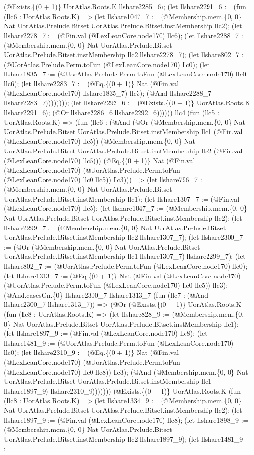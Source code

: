 \documentclass[11pt]{article}
\begin{document}
(@Exists.\{(0 + 1)\} UorAtlas.Roots.K llshare2285\_6); (let llshare2291\_6 := (fun (llc6 : UorAtlas.Roots.K) => (let llshare1047\_7 := (@Membership.mem.\{0, 0\} Nat UorAtlas.Prelude.Bitset UorAtlas.Prelude.Bitset.instMembership llc2); (let llshare2278\_7 := (@Fin.val (@LexLeanCore.node170) llc6); (let llshare2288\_7 := (@Membership.mem.\{0, 0\} Nat UorAtlas.Prelude.Bitset UorAtlas.Prelude.Bitset.instMembership llc2 llshare2278\_7); (let llshare802\_7 := (@UorAtlas.Prelude.Perm.toFun (@LexLeanCore.node170) llc0); (let llshare1835\_7 := (@UorAtlas.Prelude.Perm.toFun (@LexLeanCore.node170) llc0 llc6); (let llshare2283\_7 := (@Eq.\{(0 + 1)\} Nat (@Fin.val (@LexLeanCore.node170) llshare1835\_7) llc3); (@And llshare2288\_7 llshare2283\_7)))))))); (let llshare2292\_6 := (@Exists.\{(0 + 1)\} UorAtlas.Roots.K llshare2291\_6); (@Or llshare2286\_6 llshare2292\_6)))))) llc4 (fun (llc5 : UorAtlas.Roots.K) => (fun (llc6 : (@And (@Or (@Membership.mem.\{0, 0\} Nat UorAtlas.Prelude.Bitset UorAtlas.Prelude.Bitset.instMembership llc1 (@Fin.val (@LexLeanCore.node170) llc5)) (@Membership.mem.\{0, 0\} Nat UorAtlas.Prelude.Bitset UorAtlas.Prelude.Bitset.instMembership llc2 (@Fin.val (@LexLeanCore.node170) llc5))) (@Eq.\{(0 + 1)\} Nat (@Fin.val (@LexLeanCore.node170) (@UorAtlas.Prelude.Perm.toFun (@LexLeanCore.node170) llc0 llc5)) llc3))) => (let llshare796\_7 := (@Membership.mem.\{0, 0\} Nat UorAtlas.Prelude.Bitset UorAtlas.Prelude.Bitset.instMembership llc1); (let llshare1307\_7 := (@Fin.val (@LexLeanCore.node170) llc5); (let llshare1047\_7 := (@Membership.mem.\{0, 0\} Nat UorAtlas.Prelude.Bitset UorAtlas.Prelude.Bitset.instMembership llc2); (let llshare2299\_7 := (@Membership.mem.\{0, 0\} Nat UorAtlas.Prelude.Bitset UorAtlas.Prelude.Bitset.instMembership llc2 llshare1307\_7); (let llshare2300\_7 := (@Or (@Membership.mem.\{0, 0\} Nat UorAtlas.Prelude.Bitset UorAtlas.Prelude.Bitset.instMembership llc1 llshare1307\_7) llshare2299\_7); (let llshare802\_7 := (@UorAtlas.Prelude.Perm.toFun (@LexLeanCore.node170) llc0); (let llshare1313\_7 := (@Eq.\{(0 + 1)\} Nat (@Fin.val (@LexLeanCore.node170) (@UorAtlas.Prelude.Perm.toFun (@LexLeanCore.node170) llc0 llc5)) llc3); (@And.casesOn.\{0\} llshare2300\_7 llshare1313\_7 (fun (llc7 : (@And llshare2300\_7 llshare1313\_7)) => (@Or (@Exists.\{(0 + 1)\} UorAtlas.Roots.K (fun (llc8 : UorAtlas.Roots.K) => (let llshare828\_9 := (@Membership.mem.\{0, 0\} Nat UorAtlas.Prelude.Bitset UorAtlas.Prelude.Bitset.instMembership llc1); (let llshare1897\_9 := (@Fin.val (@LexLeanCore.node170) llc8); (let llshare1481\_9 := (@UorAtlas.Prelude.Perm.toFun (@LexLeanCore.node170) llc0); (let llshare2310\_9 := (@Eq.\{(0 + 1)\} Nat (@Fin.val (@LexLeanCore.node170) (@UorAtlas.Prelude.Perm.toFun (@LexLeanCore.node170) llc0 llc8)) llc3); (@And (@Membership.mem.\{0, 0\} Nat UorAtlas.Prelude.Bitset UorAtlas.Prelude.Bitset.instMembership llc1 llshare1897\_9) llshare2310\_9))))))) (@Exists.\{(0 + 1)\} UorAtlas.Roots.K (fun (llc8 : UorAtlas.Roots.K) => (let llshare1334\_9 := (@Membership.mem.\{0, 0\} Nat UorAtlas.Prelude.Bitset UorAtlas.Prelude.Bitset.instMembership llc2); (let llshare1897\_9 := (@Fin.val (@LexLeanCore.node170) llc8); (let llshare1898\_9 := (@Membership.mem.\{0, 0\} Nat UorAtlas.Prelude.Bitset UorAtlas.Prelude.Bitset.instMembership llc2 llshare1897\_9); (let llshare1481\_9 := 
\end{document}
